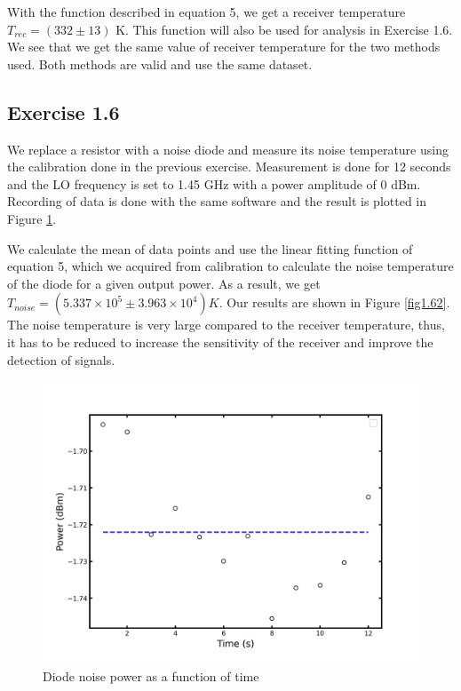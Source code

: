 \documentclass[12pt]{article}
\begin{document}
With the function described in equation 5, we get a receiver temperature $T_{rec} = (332 \pm 13)$ K. This function will also be used for analysis in Exercise 1.6. 
We see that we get the same value of receiver temperature for the two methods used. Both methods are valid and use the same dataset. 

\subsection{Exercise 1.6}

We replace a resistor with a noise diode and measure its noise temperature using the calibration done in the previous exercise. Measurement is done for 12 seconds and the LO frequency is set to 1.45 GHz with a power amplitude of 0 dBm. Recording of data is done with the same software and the result is plotted in Figure \ref{fig1.61}.

We calculate the mean of data points and use the linear fitting function of equation 5, which we acquired from calibration to calculate the noise temperature of the diode for a given output power. As a result, we get $T_{noise} = (5.337 \times 10^{5}  \pm 3.963 \times 10^{4}) K$. Our results are shown in Figure \ref{fig1.62}. The noise temperature is very large compared to the receiver temperature, thus, it has to be reduced to increase the sensitivity of the receiver and improve the detection of signals. 

\begin{figure}[H]
    \centering
    \includegraphics[scale=.5]{fig/Exercise_6_1.jpg}
    \caption{Diode noise power as a function of time}
    \label{fig1.61}
\end{figure}
\end{document}
